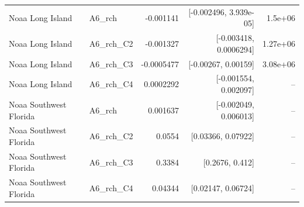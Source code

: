 \begin{table}[tbp]
\begin{tabular}{llrrr}
Noaa Long Island & A6\_rch & -0.001141 & [-0.002496, 3.939e-05] & 1.5e+06 \\
Noaa Long Island & A6\_rch\_C2 & -0.001327 & [-0.003418, 0.0006294] & 1.27e+06 \\
Noaa Long Island & A6\_rch\_C3 & -0.0005477 & [-0.00267, 0.00159] & 3.08e+06 \\
Noaa Long Island & A6\_rch\_C4 & 0.0002292 & [-0.001554, 0.002097] & -- \\
Noaa Southwest Florida & A6\_rch & 0.001637 & [-0.002049, 0.006013] & -- \\
Noaa Southwest Florida & A6\_rch\_C2 & 0.0554 & [0.03366, 0.07922] & -- \\
Noaa Southwest Florida & A6\_rch\_C3 & 0.3384 & [0.2676, 0.412] & -- \\
Noaa Southwest Florida & A6\_rch\_C4 & 0.04344 & [0.02147, 0.06724] & -- \\
\bottomrule\end{tabular}\end{table}
